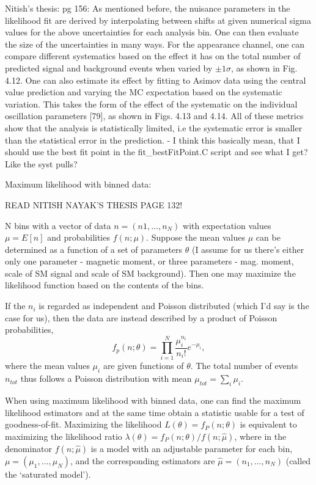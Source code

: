 Nitish's thesis:
pg 156: As mentioned before, the nuisance parameters in the likelihood fit are derived by interpolating between shifts at given numerical sigma values for the above uncertainties for each analysis bin. One can then evaluate the size of the uncertainties in many ways. For the appearance channel, one can compare different systematics based on the effect it has on the total number of predicted signal and background events when varied by $\pm1\sigma$, as shown in Fig. 4.12. One can also estimate its effect by fitting to Asimov data using the central value prediction and varying the MC expectation based on the systematic variation. This takes the form of the effect of the systematic on the individual oscillation parameters [79], as shown in Figs. 4.13 and 4.14. All of these metrics show that the analysis is statistically limited, i.e the systematic error is smaller than the statistical error in the prediction.
- I think this basically mean, that I should use the best fit point in the fit_bestFitPoint.C script and see what I get? Like the syst pulls?

Maximum likelihood with binned data:

READ NITISH NAYAK'S THESIS PAGE 132! \cite{NitishOscMeasuremetPCAStatisticalAna2021.pdf}

N bins with a vector of data $n=\left(n1,...,n_N \right)$ with expectation values $\mu=E\left[n\right]$ and probabilities $f\left(n;\mu\right)$. Suppose the mean values $\mu$ can be determined as a function of a set of parameters $\theta$ (I assume for us there's either only one parameter - magnetic moment, or three parameters - mag. moment, scale of SM signal and scale of SM background). Then one may maximize the likelihood function based on the contents of the bins.

If the $n_i$ is regarded as independent and Poisson distributed (which I'd say is the case for us), then the data are instead described by a product of Poisson probabilities,
\begin{equation}
f_p\left(n;\theta\right)=\prod_{i=1}^{N} \frac{\mu_i^{n_i}}{n_i!}e^{-\mu_i},
\end{equation}
where the mean values $\mu_i$ are given functions of $\theta$. The total number of events $n_{tot}$ thus follows a Poisson distribution with mean $\mu_{tot}=\sum_i \mu_i$.

When using maximum likelihood with binned data, one can find the maximum likelihood estimators and at the same time obtain a statistic usable for a test of goodness-of-fit. Maximizing the likelihood $L\left(\theta\right)=f_P\left(n;\theta\right)$ is equivalent to maximizing the likelihood ratio $\lambda\left(\theta\right)=f_P\left(n;\theta\right) / f\left(n;\hat{\mu}\right)$, where in the denominator $f\left(n;\hat{\mu}\right)$ is a model with an adjustable parameter for each bin, $\mu=\left(\mu_1,...,\mu_N\right)$, and the corresponding estimators are $\hat{\mu}=\left(n_1,...,n_N\right)$ (called the `saturated model').

